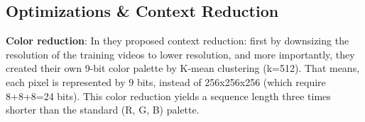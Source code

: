 \subsection{Optimizations \& Context Reduction}

\textbf{Color reduction}: In \cite{imagegpt} they proposed context reduction: first by downsizing the resolution of the training videos to lower resolution, and more importantly, they created their own 9-bit color palette by K-mean clustering (k=512). That means, each pixel is represented by 9 bits, instead of 256x256x256 (which require 8+8+8=24 bits). This color reduction yields a sequence length three times shorter than the standard (R, G, B) palette.

